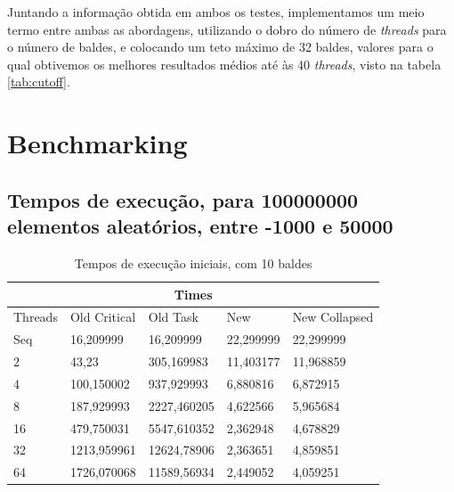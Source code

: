 \documentclass[a4paper]{report}
\begin{document}
Juntando a informação obtida em ambos os testes, implementamos um meio termo
entre ambas as abordagens, utilizando o dobro do número de \textit{threads} para
o número de baldes, e colocando um teto máximo de 32 baldes, valores para o qual
obtivemos os melhores resultados médios até às 40 \textit{threads}, visto na
tabela \ref{tab:cutoff}.

\appendix

\chapter{Benchmarking}
\section{Tempos de execução, para 100000000 elementos aleatórios, entre -1000 e
50000}
\begin{table}[h]
\centering
\begin{tabular}{|l|l|l|l|l|}
\hline
\multicolumn{5}{|c|}{Times}                                      \\ \hline
Threads & Old Critical & Old Task    & New       & New Collapsed \\ \hline
Seq     & 16,209999    & 16,209999   & 22,299999 & 22,299999     \\ \hline
2       & 43,23        & 305,169983  & 11,403177 & 11,968859     \\ \hline
4       & 100,150002   & 937,929993  & 6,880816  & 6,872915      \\ \hline
8       & 187,929993   & 2227,460205 & 4,622566  & 5,965684      \\ \hline
16      & 479,750031   & 5547,610352 & 2,362948  & 4,678829      \\ \hline
32      & 1213,959961  & 12624,78906 & 2,363651  & 4,859851      \\ \hline
64      & 1726,070068  & 11589,56934 & 2,449052  & 4,059251      \\ \hline
\end{tabular}
\caption{\label{tab:Times}Tempos de execução iniciais, com 10 baldes}
\end{table}
\end{document}
